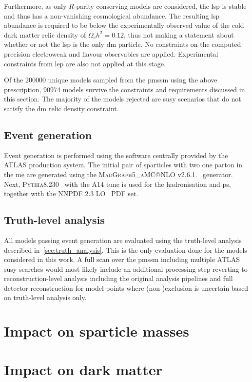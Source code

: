 Furthermore, as only $R$-parity conserving models are considered, the \gls{lsp} is stable and thus has a non-vanishing cosmological abundance. The resulting \gls{lsp} abundance is required to be below the experimentally observed value of the cold dark matter relic density of $\Omega_c h^2 = 0.12$, thus not making a statement about whether or not the \gls{lsp} is the only \gls{dm} particle. No constraints on the computed precision electroweak and flavour observables are applied. Experimental constraints from \eg \gls{lep} are also not applied at this stage. 

Of the \num[group-separator={,}]{200000} unique models sampled from the \gls{pmssm} using the above prescription, \num[group-separator={,}]{90974} models survive the constraints and requirements discussed in this section. The majority of the models rejected are \gls{susy} scenarios that do not satisfy the \gls{dm} relic density constraint.

\subsection{Event generation}

Event generation is performed using the software centrally provided by the ATLAS production system. The initial pair of sparticles with two one parton in the \gls{me} are generated using the \textsc{MadGraph5\_aMC@NLO} v2.6.1.~\cite{MGaMCNLO:2014hca,Frederix:2012ps} generator. Next, \textsc{Pythia8.230}~\cite{Pythia8:2007gs}  with the \textsc{A14} tune is used for the hadronisation and \gls{ps}, together with the NNPDF 2.3 LO~\cite{Ball:2012cx} \gls{PDF} set.
		
\subsection{Truth-level analysis}

All models passing event generation are evaluated using the truth-level analysis described in~\cref{sec:truth_analysis}. This is the only evaluation done for the models considered in this work. A full scan over the \gls{pmssm} including multiple ATLAS \gls{susy} searches would most likely include an additional processing step reverting to reconstruction-level analysis including the original analysis pipelines and full detector reconstruction for model points where (non-)exclusion is uncertain based on truth-level analysis only.


\section{Impact on sparticle masses}

\section{Impact on dark matter}
